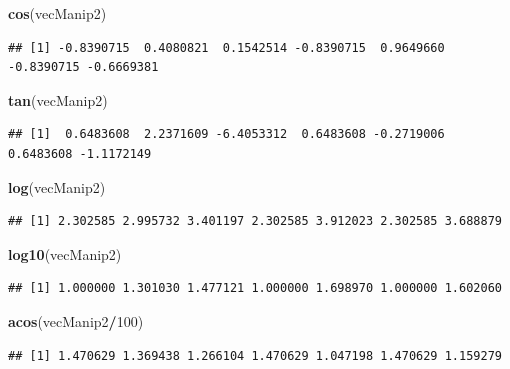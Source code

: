 \documentclass[
]{book}
\newenvironment{Shaded}{\begin{snugshade}}{\end{snugshade}}
\newcommand{\DecValTok}[1]{\textcolor[rgb]{0.00,0.00,0.81}{#1}}
\newcommand{\KeywordTok}[1]{\textcolor[rgb]{0.13,0.29,0.53}{\textbf{#1}}}
\newcommand{\NormalTok}[1]{#1}
\newcommand{\OperatorTok}[1]{\textcolor[rgb]{0.81,0.36,0.00}{\textbf{#1}}}
\begin{document}
\begin{Shaded}
\begin{Highlighting}[]
\KeywordTok{cos}\NormalTok{(vecManip2)}
\end{Highlighting}
\end{Shaded}

\begin{verbatim}
## [1] -0.8390715  0.4080821  0.1542514 -0.8390715  0.9649660 -0.8390715 -0.6669381
\end{verbatim}

\begin{Shaded}
\begin{Highlighting}[]
\KeywordTok{tan}\NormalTok{(vecManip2)}
\end{Highlighting}
\end{Shaded}

\begin{verbatim}
## [1]  0.6483608  2.2371609 -6.4053312  0.6483608 -0.2719006  0.6483608 -1.1172149
\end{verbatim}

\begin{Shaded}
\begin{Highlighting}[]
\KeywordTok{log}\NormalTok{(vecManip2)}
\end{Highlighting}
\end{Shaded}

\begin{verbatim}
## [1] 2.302585 2.995732 3.401197 2.302585 3.912023 2.302585 3.688879
\end{verbatim}

\begin{Shaded}
\begin{Highlighting}[]
\KeywordTok{log10}\NormalTok{(vecManip2)}
\end{Highlighting}
\end{Shaded}

\begin{verbatim}
## [1] 1.000000 1.301030 1.477121 1.000000 1.698970 1.000000 1.602060
\end{verbatim}

\begin{Shaded}
\begin{Highlighting}[]
\KeywordTok{acos}\NormalTok{(vecManip2}\OperatorTok{/}\DecValTok{100}\NormalTok{)}
\end{Highlighting}
\end{Shaded}

\begin{verbatim}
## [1] 1.470629 1.369438 1.266104 1.470629 1.047198 1.470629 1.159279
\end{verbatim}
\end{document}
